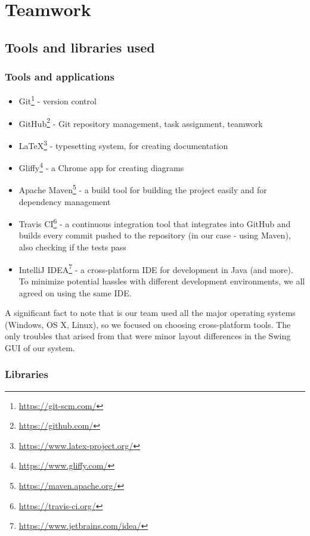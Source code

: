 \documentclass[a4paper,12pt]{article}
\begin{document}
\section{Teamwork}

\subsection{Tools and libraries used}

\subsubsection*{Tools and applications}

\begin{itemize}
	\item Git\footnote{\url{https://git-scm.com/}} - version control
	\item GitHub\footnote{\url{https://github.com/}} - Git repository management, task assignment, teamwork
	\item \LaTeX\footnote{\url{https://www.latex-project.org/}} - typesetting system, for creating documentation
	\item Gliffy\footnote{\url{https://www.gliffy.com/}} - a Chrome app for creating diagrams
	\item Apache Maven\footnote{\url{https://maven.apache.org/}} - a build tool for building the project easily and for dependency management
	\item Travis CI\footnote{\url{https://travis-ci.org/}} - a continuous integration tool that integrates into GitHub and builds every commit pushed to the repository (in our case - using Maven), also checking if the tests pass
	\item IntelliJ IDEA\footnote{\url{https://www.jetbrains.com/idea/}} - a cross-platform IDE for development in Java (and more). To minimize potential hassles with different development environments, we all agreed on using the same IDE.
\end{itemize}


A significant fact to note that is our team used all the major operating systems (Windows, OS X, Linux), so we focused on choosing cross-platform tools. The only troubles that arised from that were minor layout differences in the Swing GUI of our system.

\subsubsection*{Libraries}
\end{document}
